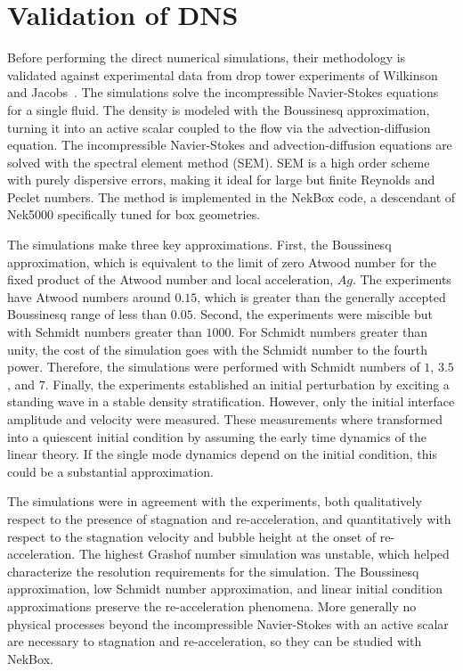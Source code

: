 \section{Validation of DNS}
Before performing the direct numerical simulations, their methodology is validated against experimental data from drop tower experiments of Wilkinson and Jacobs~\cite{Wilkinson2007}.
The simulations solve the incompressible Navier-Stokes equations for a single fluid.
The density is modeled with the Boussinesq approximation, turning it into an active scalar coupled to the flow via the advection-diffusion equation.
The incompressible Navier-Stokes and advection-diffusion equations are solved with the spectral element method (SEM).
SEM is a high order scheme with purely dispersive errors, making it ideal for large but finite Reynolds and Peclet numbers.
The method is implemented in the NekBox code, a descendant of Nek5000 specifically tuned for box geometries.

The simulations make three key approximations.
First, the Boussinesq approximation, which is equivalent to the limit of zero Atwood number for the fixed product of the Atwood number and local acceleration, $Ag$.
The experiments have Atwood numbers around $0.15$, which is greater than the generally accepted Boussinesq range of less than $0.05$.
Second, the experiments were miscible but with Schmidt numbers greater than $1000$.
For Schmidt numbers greater than unity, the cost of the simulation goes with the Schmidt number to the fourth power.
Therefore, the simulations were performed with Schmidt numbers of $1$, $3.5$, and $7$.
Finally, the experiments established an initial perturbation by exciting a standing wave in a stable density stratification.
However, only the initial interface amplitude and velocity were measured.
These measurements where transformed into a quiescent initial condition by assuming the early time dynamics of the linear theory.
If the single mode dynamics depend on the initial condition, this could be a substantial approximation.

The simulations were in agreement with the experiments, both qualitatively respect to the presence of stagnation and re-acceleration, and quantitatively with respect to the stagnation velocity and bubble height at the onset of re-acceleration.
The highest Grashof number simulation was unstable, which helped characterize the resolution requirements for the simulation.
The Boussinesq approximation, low Schmidt number approximation, and linear initial condition approximations preserve the re-acceleration phenomena.
More generally no physical processes beyond the incompressible Navier-Stokes with an active scalar are necessary to stagnation and re-acceleration, so they can be studied with NekBox.

